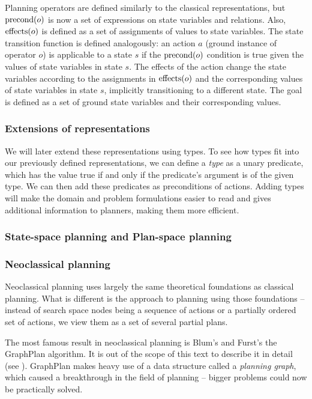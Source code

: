 Planning operators are defined similarly to the classical representations, but
$\operatorname{\textrm{precond}}(o)$ is now a set of expressions on state variables and relations.
Also, $\operatorname{\textrm{effects}}(o)$ is defined as a set of assignments of values to state variables.
The state transition function is defined analogously: an action $a$ (ground instance
of operator $o$)
is applicable to a state $s$ if the $\operatorname{\textrm{precond}}(o)$ condition is true given the values
of state variables in state $s$. The effects of the action change the state variables
according to the assignments in $\operatorname{\textrm{effects}}(o)$ and the corresponding values of state
variables in state $s$, implicitly transitioning to a different state.
The goal is defined as a set of ground state variables and their corresponding values.
\citep[Section~2.5.2]{Ghallab2004}

\subsubsection{Extensions of representations}

We will later extend these representations using types.
To see how types fit into our previously defined representations, we can
define a \textit{type} as a unary predicate, which has the value true
if and only if the predicate's argument is of the given type.
We can then add these predicates as preconditions of actions.
Adding types will make the domain and problem formulations
easier to read and gives additional information
to planners, making them more efficient.
\citep[Section 2.4.1]{Ghallab2004}

\subsubsection{State-space planning and Plan-space planning}


\subsubsection{Neoclassical planning}

Neoclassical planning uses largely the same theoretical foundations as classical 
planning. What is different is the approach to planning using those foundations
-- instead of search space nodes being a sequence of actions or a partially ordered
set of actions, we view them as a set of several partial plans.
\citep[Part~II]{Ghallab2004}

The most famous result in neoclassical planning is Blum's and Furst's the GraphPlan algorithm. \citep{Blum1997}
It is out of the scope of this text to describe it in detail
(see \citep[Section~6.3]{Ghallab2004}).
GraphPlan makes heavy use of a data structure called a \textit{planning graph},
which caused a breakthrough in the field of planning -- bigger problems could
now be practically solved.

